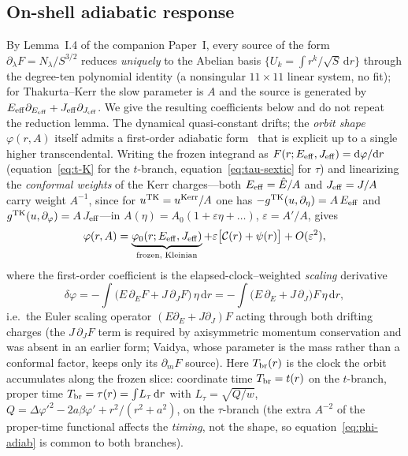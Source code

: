 \documentclass[12pt]{iopart}
\theoremstyle{plain}
\theoremstyle{definition}
\theoremstyle{remark}
\newcommand{\Ehat}{\hat E}
\newcommand{\dd}{\mathrm{d}}
\begin{document}
\subsection{On-shell adiabatic response}
\label{sec:adiabatic}
By Lemma~I.4 of the companion Paper~I, every source of the form
$\partial_\lambda F=N_\lambda/S^{3/2}$ reduces \emph{uniquely} to the Abelian basis
$\{U_k=\int r^k/\sqrt S\,\dd r\}$ through the degree-ten polynomial identity (a
nonsingular $11\times11$ linear system, no fit); for Thakurta--Kerr the slow parameter is
$A$ and the source is generated by $E_{\rm eff}\partial_{E_{\rm eff}}+J_{\rm
eff}\partial_{J_{\rm eff}}$. We give the resulting coefficients below and do not repeat
the reduction lemma. The dynamical quasi-constant drifts; the
\emph{orbit shape} $\varphi(r,A)$ itself admits a first-order adiabatic
form~\cite{BornFock1928,BenderOrszag1999} that is explicit up to a single higher
transcendental. Writing the frozen integrand as
$F(r;E_{\rm eff},J_{\rm eff})=\dd\varphi/\dd r$ (equation~\eqref{eq:t-K} for the
$t$-branch, equation~\eqref{eq:tau-sextic} for $\tau$) and linearizing the
\emph{conformal weights} of the Kerr charges---both $E_{\rm eff}=\Ehat/A$ and
$J_{\rm eff}=J/A$ carry weight $A^{-1}$, since for $u^{\rm TK}=u^{\rm Kerr}/A$ one
has $-g^{\rm TK}(u,\partial_\eta)=A\,E_{\rm eff}$ and
$g^{\rm TK}(u,\partial_\varphi)=A\,J_{\rm eff}$---in
$A(\eta)=A_0(1+\varepsilon\eta+\dots)$, $\varepsilon=A'/A$, gives
\begin{equation}
    \varphi(r,A)=\underbrace{\varphi_0(r;E_{\rm eff},J_{\rm eff})}_{\text{frozen, Kleinian}}
    +\varepsilon\big[\mathcal{C}(r)+\psi(r)\big]+O(\varepsilon^2),
    \label{eq:phi-adiab}
\end{equation}
where the first-order coefficient is the elapsed-clock--weighted \emph{scaling}
derivative
\begin{equation}
    \delta\varphi=-\!\int\!\big(\Ehat\,\partial_E F+J\,\partial_J F\big)\,\eta\,\dd r
    =-\!\int\!\big(E\,\partial_E+J\,\partial_J\big)F\,\eta\,\dd r,
    \label{eq:deltaphi-EJ}
\end{equation}
i.e.\ the Euler scaling operator $(E\partial_E+J\partial_J)F$ acting through both
drifting charges (the $J\,\partial_J F$ term is required by axisymmetric momentum
conservation and was absent in an earlier form; Vaidya, whose parameter is the
mass rather than a conformal factor, keeps only its $\partial_m F$ source). Here
$T_{\rm br}(r)$
is the clock the orbit accumulates along the frozen slice: coordinate time
$T_{\rm br}=t(r)$ on the $t$-branch, proper time $T_{\rm br}=\tau(r)=\int\!L_\tau\,\dd r$ with
$L_\tau=\sqrt{Q/w}$, $Q=\Delta\varphi'^2-2a\beta\varphi'+r^2/(r^2+a^2)$, on the
$\tau$-branch (the extra $A^{-2}$ of the proper-time functional affects the
\emph{timing}, not the shape, so equation~\eqref{eq:phi-adiab} is common to both
branches).
\end{document}
